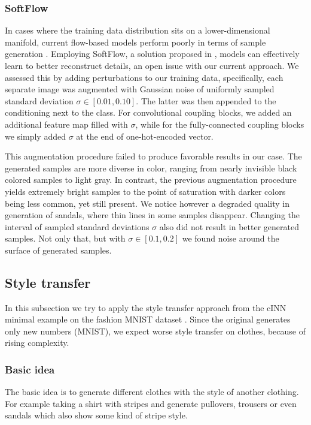 \documentclass[final]{cvpr}
\begin{document}
\subsubsection{SoftFlow}\label{sec:experiment_softflow}
In cases where the training data distribution sits on a lower-dimensional manifold, current flow-based models perform poorly in terms of sample generation \cite{softflow}. Employing SoftFlow, a solution proposed in \cite{softflow}, models can effectively learn to better reconstruct details, an open issue with our current approach. We assessed this by adding perturbations to our training data, specifically, each separate image was augmented with Gaussian noise of uniformly sampled standard deviation $\sigma \in [0.01, 0.10]$. The latter was then appended to the conditioning next to the class. For convolutional coupling blocks, we added an additional feature map filled with $\sigma$, while for the fully-connected coupling blocks we simply added $\sigma$ at the end of one-hot-encoded vector.

This augmentation procedure failed to produce favorable results in our case. The generated samples are more diverse in color, ranging from nearly invisible black colored samples to light gray. In contrast, the previous augmentation procedure yields extremely bright samples to the point of saturation with darker colors being less common, yet still present. We notice however a degraded quality in generation of sandals, where thin lines in some samples disappear. Changing the interval of sampled standard deviations $\sigma$ also did not result in better generated samples. Not only that, but with $\sigma \in [0.1, 0.2]$ we found noise around the surface of generated samples.

\subsection{Style transfer}
In this subsection we try to apply the style transfer approach from the cINN minimal example on the fashion MNIST dataset \cite{main_paper_CINN}. Since the original generates only new numbers (MNIST), we expect worse style transfer on clothes, because of rising complexity.

\subsubsection{Basic idea}\label{sec:styletransfer_basicidea}
The basic idea is to generate different clothes with the style of another clothing. For example taking a shirt with stripes and generate pullovers, trousers or even sandals which also show some kind of stripe style.
\end{document}
